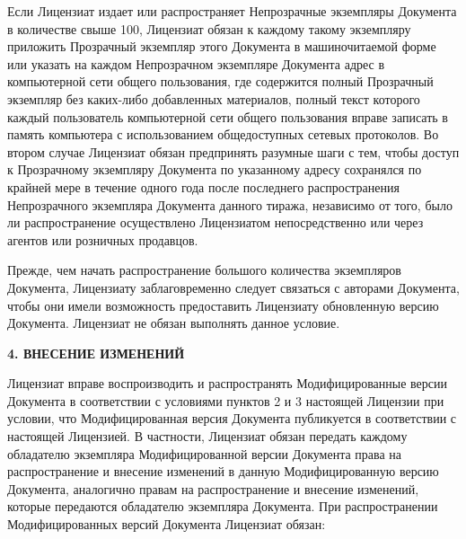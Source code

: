 Если Лицензиат издает или распространяет Непрозрачные экземпляры
Документа в количестве свыше 100, Лицензиат обязан к каждому такому
экземпляру приложить Прозрачный экземпляр этого Документа в
машиночитаемой форме или указать на каждом Непрозрачном экземпляре
Документа адрес в компьютерной сети общего пользования, где содержится
полный Прозрачный экземпляр без каких-либо добавленных материалов,
полный текст которого каждый пользователь компьютерной сети общего
пользования вправе записать в память компьютера с использованием
общедоступных сетевых протоколов. Во втором случае Лицензиат обязан
предпринять разумные шаги с тем, чтобы доступ к Прозрачному экземпляру
Документа по указанному адресу сохранялся по крайней мере в течение
одного года после последнего распространения Непрозрачного экземпляра
Документа данного тиража, независимо от того, было ли распространение
осуществлено Лицензиатом непосредственно или через агентов или розничных
продавцов.

Прежде, чем начать распространение большого количества экземпляров
Документа, Лицензиату заблаговременно следует связаться с авторами
Документа, чтобы они имели возможность предоставить Лицензиату
обновленную версию Документа. Лицензиат не обязан выполнять данное
условие.


\begin{center}
{\Large\bf 4. ВНЕСЕНИЕ ИЗМЕНЕНИЙ\par}
\end{center}


Лицензиат вправе воспроизводить и распространять Модифицированные версии
Документа в соответствии с условиями пунктов 2 и 3 настоящей Лицензии
при условии, что Модифицированная версия Документа публикуется в
соответствии с настоящей Лицензией. В частности, Лицензиат обязан
передать каждому обладателю экземпляра Модифицированной версии Документа
права на распространение и внесение изменений в данную Модифицированную
версию Документа, аналогично правам на распространение и внесение
изменений, которые передаются обладателю экземпляра Документа. При
распространении Модифицированных версий Документа Лицензиат обязан:


